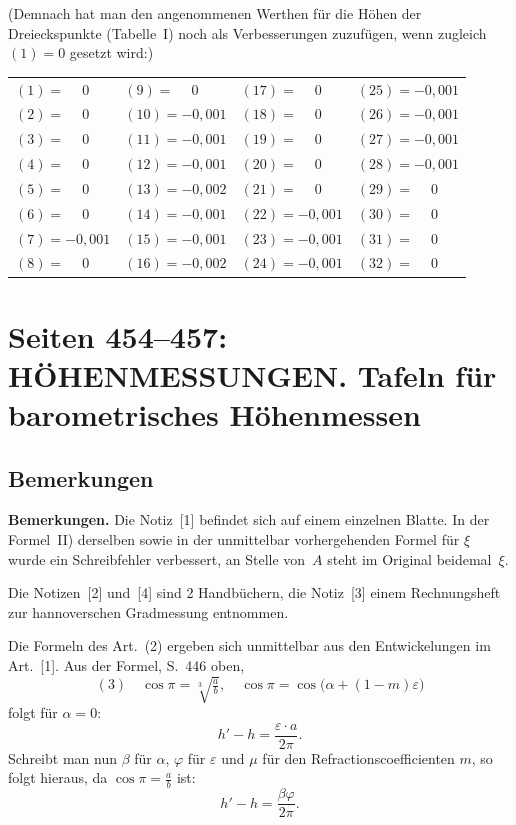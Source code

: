 \documentclass[12pt,a4paper]{article}
\theoremstyle{plain}
\theoremstyle{definition}
\theoremstyle{remark}
\begin{document}
\noindent
(Demnach hat man den angenommenen Werthen f\"ur die H\"ohen der Dreieckspunkte (Tabelle~I) noch als Verbesserungen zuzuf\"ugen, wenn zugleich $(1) = 0$ gesetzt wird:)

\medskip
\noindent
\begin{tabular}{llll}
$(1) = \phantom{-}0$ & $(9) = \phantom{-}0$ & $(17) = \phantom{-}0$ & $(25) = -0{,}001$ \\
$(2) = \phantom{-}0$ & $(10) = -0{,}001$ & $(18) = \phantom{-}0$ & $(26) = -0{,}001$ \\
$(3) = \phantom{-}0$ & $(11) = -0{,}001$ & $(19) = \phantom{-}0$ & $(27) = -0{,}001$ \\
$(4) = \phantom{-}0$ & $(12) = -0{,}001$ & $(20) = \phantom{-}0$ & $(28) = -0{,}001$ \\
$(5) = \phantom{-}0$ & $(13) = -0{,}002$ & $(21) = \phantom{-}0$ & $(29) = \phantom{-}0$ \\
$(6) = \phantom{-}0$ & $(14) = -0{,}001$ & $(22) = -0{,}001$ & $(30) = \phantom{-}0$ \\
$(7) = -0{,}001$ & $(15) = -0{,}001$ & $(23) = -0{,}001$ & $(31) = \phantom{-}0$ \\
$(8) = \phantom{-}0$ & $(16) = -0{,}002$ & $(24) = -0{,}001$ & $(32) = \phantom{-}0$
\end{tabular}

\vfill
\eject

\section*{Seiten 454--457: H\"OHENMESSUNGEN. Tafeln f\"ur barometrisches H\"ohenmessen}

\subsection*{Bemerkungen}

\textbf{Bemerkungen.} Die Notiz~[1] befindet sich auf einem einzelnen Blatte. In der Formel~II) derselben sowie in der unmittelbar vorhergehenden Formel f\"ur $\xi$ wurde ein Schreibfehler verbessert, an Stelle von~$A$ steht im Original beidemal~$\xi$.

Die Notizen~[2] und~[4] sind 2 Handb\"uchern, die Notiz~[3] einem Rechnungsheft zur hannoverschen Gradmessung entnommen.

Die Formeln des Art.~(2) ergeben sich unmittelbar aus den Entwickelungen im Art.~[1]. Aus der Formel, S.~446 oben,
\[
(3)\quad \cos\pi = \sqrt[3]{\tfrac{a}{b}}, \quad \cos\pi = \cos\bigl(\alpha + (1-m)\varepsilon\bigr)
\]
folgt f\"ur $\alpha = 0$:
\[
h' - h = \frac{\varepsilon\cdot a}{2\pi}.
\]
Schreibt man nun $\beta$ f\"ur $\alpha$, $\varphi$ f\"ur $\varepsilon$ und $\mu$ f\"ur den Refractionscoefficienten $m$, so folgt hieraus, da $\cos\pi = \frac{a}{b}$ ist:
\[
h' - h = \frac{\beta\varphi}{2\pi}.
\]
\end{document}
